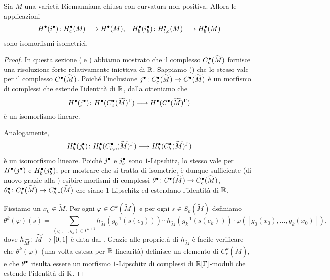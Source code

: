 \begin{proposition}
Sia $M$ una varietà Riemanniana chiusa con curvatura non positiva. Allora le applicazioni
\begin{align*}
\map{H^\bul(i^\bul)}{H^\bul_c(M)}{H^\bul(M)},&&\map{H^\bul_b(i^\bul_b)}{H^\bul_{b,c}(M)}{H^\bul_b(M)}
\end{align*}
sono isomorfismi isometrici.
\end{proposition}
\begin{proof}
In questa sezione ( e ) abbiamo mostrato che il complesso $C^\bullet_c(\widetilde M)$ fornisce una risoluzione forte relativamente iniettiva di $\mathbb{R}$. Sappiamo () che lo stesso vale per il complesso $C^\bullet(\widetilde M)$. Poiché l'inclusione $\map{j^\bul}{C^\bul_c(\widetilde M)}{C^\bul(\widetilde M)}$ è un morfismo di complessi che estende l'identità di $\mathbb{R}$, dalla  otteniamo che 
\[
\map{H^\bul(j^\bul)}{H^\bul(C^\bul_c(\widetilde M)^\Gamma)}{H^\bul(C^\bul(\widetilde M)^\Gamma)}
\]
è un isomorfismo lineare.

Analogamente,
\[
\map{H^\bul_b(j^\bul_b)}{H^\bul_b(C^\bul_{b,c}(\widetilde M)^\Gamma)}{H^\bul_b(C^\bul_b(\widetilde M)^\Gamma)}
\]
è un isomorfismo lineare. Poiché $j^\bullet$ e $j^\bullet_b$ sono $1$-Lipschitz, lo stesso vale per $H^\bullet(j^\bullet)$ e $H^\bullet_b(j^\bullet_b)$; per mostrare che si tratta di isometrie, è dunque sufficiente (di nuovo grazie alla ) esibire morfismi di complessi $\map{\theta^\bul}{C^\bul(\widetilde M)}{C^\bul_c(\widetilde M)}$, $\map{\theta^\bul_b}{C^\bul_b(\widetilde M)}{C^\bul_{b,c}(\widetilde M)}$ che siano $1$-Lipschitz ed estendano l'identità di $\mathbb{R}$.

Fissiamo un $x_0\in\widetilde M$. Per ogni $\varphi\in C^k(\widetilde M)$ e per ogni $s\in S_k(\widetilde M)$ definiamo
\[
\theta^k(\varphi)(s)=\sum_{(g_0,\ldots,g_k)\in\Gamma^{k+1}}h_{\widetilde M}(g_0^{-1}(s(e_0)))\cdots h_{\widetilde M}(g_k^{-1}(s(e_k)))\cdot\varphi([g_0(x_0),\ldots,g_k(x_0)]),
\]
dove $\map{h_{\widetilde M}}{\widetilde M}{[0,1]}$ è data dal . Grazie alle proprietà di $h_{\widetilde M}$ è facile verificare che $\theta^k(\varphi)$ (una volta estesa per $\mathbb{R}$-linearità) definisce un elemento di $C^k_c(\widetilde M)$, e che $\theta^\bullet$ risulta essere un morfismo $1$-Lipschitz di complessi di $\mathbb{R}[\Gamma]$-moduli che estende l'identità di $\mathbb{R}$.


\end{proof}
